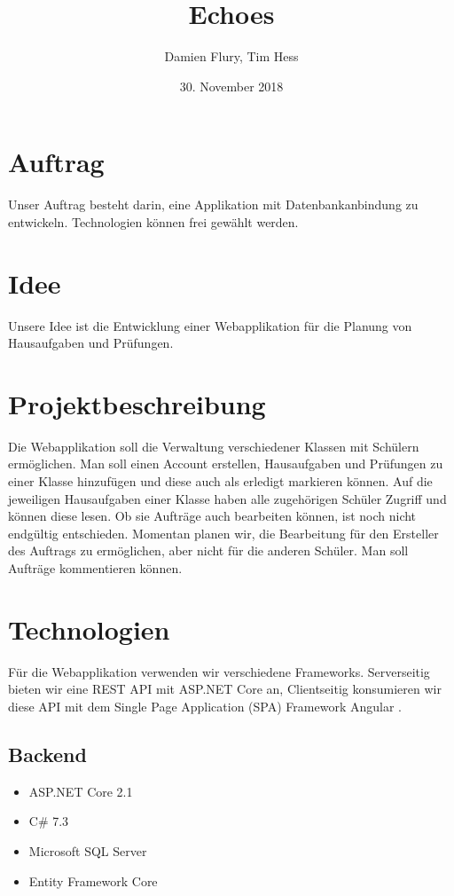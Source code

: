 \documentclass[a4paper, titlepage]{article}
\title{Echoes}
\author{Damien Flury, Tim Hess}
\date{30. November 2018}
\begin{document}
    \maketitle
    \tableofcontents
    \newpage

    \section{Auftrag}
    Unser Auftrag besteht darin, eine Applikation mit Datenbankanbindung zu entwickeln. Technologien
    können frei gewählt werden.
    \section{Idee}
    Unsere Idee ist die Entwicklung einer Webapplikation für die Planung von Hausaufgaben
    und Prüfungen. 
    \section{Projektbeschreibung}
    Die Webapplikation soll die Verwaltung verschiedener Klassen mit Schülern ermöglichen.
    Man soll einen Account erstellen, Hausaufgaben und Prüfungen zu einer Klasse hinzufügen
    und diese auch als erledigt markieren können. Auf die jeweiligen Hausaufgaben einer Klasse
    haben alle zugehörigen Schüler Zugriff und können diese lesen. Ob sie Aufträge auch bearbeiten
    können, ist noch nicht endgültig entschieden. Momentan planen wir, die Bearbeitung für den Ersteller
    des Auftrags zu ermöglichen, aber nicht für die anderen Schüler. Man soll Aufträge kommentieren
    können.
    \section{Technologien}
    Für die Webapplikation verwenden wir verschiedene Frameworks. Serverseitig bieten wir
    eine REST API mit ASP.NET Core \cite{Dotnet} an, Clientseitig konsumieren wir diese API mit dem Single
    Page Application (SPA) Framework Angular \cite{Angular}.
    \subsection{Backend}
    \begin{itemize}
        \item ASP.NET Core 2.1
        \item C\# 7.3
        \item Microsoft SQL Server
        \item Entity Framework Core
    \end{itemize}
\end{document}
